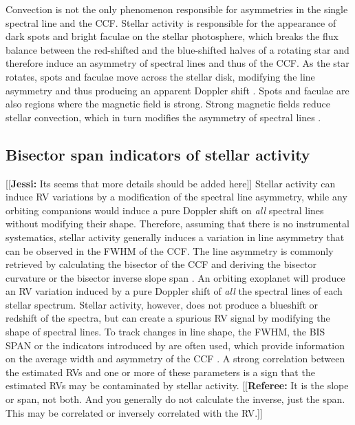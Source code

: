 \documentclass[11pt, oneside]{article}
\newcommand{\jessi}[1]{{\color{Purple}[[\textbf{Jessi: }#1]]}}
\newcommand{\comment}[1]{{\color{red}[[\textbf{Referee: }#1]]}}
\begin{document}
Convection is not the only phenomenon responsible for asymmetries in the single spectral line and the CCF. Stellar activity is responsible for the appearance of dark spots and bright faculae on the stellar photosphere, which breaks the flux balance between the red-shifted and the blue-shifted halves of a rotating star and therefore induce an asymmetry of spectral lines and thus of the CCF. As the star rotates, spots and faculae move across the stellar disk, modifying the line asymmetry and thus producing an apparent Doppler shift \citep{Saar-1997b,Hatzes-2002,Kurster2003,Desort-2007,Lagrange-2010,Boisse-2012b}. Spots and faculae are also regions where the magnetic field is strong. Strong magnetic fields reduce stellar convection, which in turn modifies the asymmetry of spectral lines \citep[][]{Cavallini-1985a,Dravins-1981,Lindegren-2003,Meunier-2010a,Dumusque-2014b}.

\subsection{Bisector span indicators of stellar activity}
\jessi{Its seems that more details should be added here}
Stellar activity can induce RV variations by a modification of the spectral line asymmetry, while any orbiting companions would induce a pure Doppler shift on \emph{all} spectral lines without modifying their shape.
Therefore, assuming that there is no instrumental systematics, stellar activity generally induces a variation in line asymmetry that can be observed in the  FWHM of the CCF. 
The line asymmetry is commonly retrieved by calculating the bisector of the CCF \citep[][]{Voigt1956} and deriving the bisector curvature \citep[][]{Hatzes1996} or the bisector inverse slope span \citep[BIS SPAN,][]{Queloz-2001}. 
An orbiting exoplanet will produce an RV variation induced by a pure Doppler shift of \emph{all} the spectral lines of each stellar spectrum. 
Stellar activity, however, does not produce a blueshift or redshift of the spectra, but can create a spurious RV signal by modifying the shape of spectral lines. To track changes in line shape, the FWHM, the BIS SPAN or the indicators introduced by \citet{Figueira-2013} are often used, which provide information on the average width and asymmetry of the CCF \citep{Hatzes1996, fiorenzano2005line, Queloz-2001}. A strong correlation between the estimated RVs and one or more of these parameters is a sign that the estimated RVs may be contaminated by stellar activity. 
\comment{It is the slope or span, not both. And you generally do not calculate the inverse, just the
span. This may be correlated or inversely correlated with the RV.}
\end{document}

